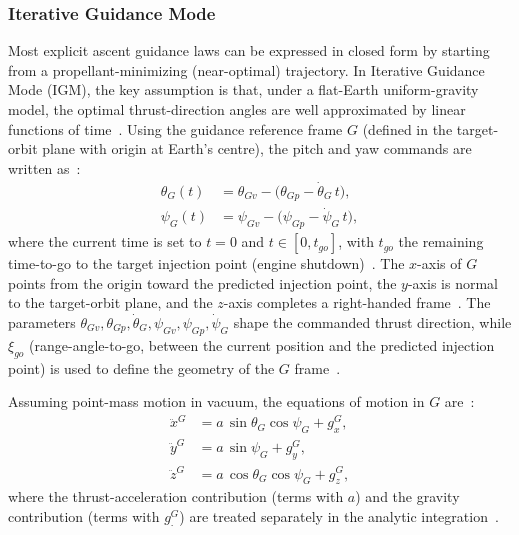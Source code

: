\subsubsection{Iterative Guidance Mode}

Most explicit ascent guidance laws can be expressed in closed form by starting from a propellant-minimizing (near-optimal) trajectory. In Iterative Guidance Mode (IGM), the key assumption is that, under a flat-Earth uniform-gravity model, the optimal thrust-direction angles are well approximated by linear functions of time~\cite{ChandlerSmith1967IterativeGuidanceMode}. Using the guidance reference frame $G$ (defined in the target-orbit plane with origin at Earth’s centre), the pitch and yaw commands are written as~\cite{SONG2015463}:
\begin{align}
\theta_G(t) &= \theta_{Gv} - \bigl(\theta_{Gp} - \dot{\theta}_G\,t\bigr),
\label{eq:igm_theta}\\
\psi_G(t)   &= \psi_{Gv} - \bigl(\psi_{Gp} - \dot{\psi}_G\,t\bigr),
\label{eq:igm_psi}
\end{align}
where the current time is set to $t=0$ and $t\in[0,t_{go}]$, with $t_{go}$ the remaining time-to-go to the target injection point (engine shutdown)~\cite{SONG2015463}.
The $x$-axis of $G$ points from the origin toward the predicted injection point, the $y$-axis is normal to the target-orbit plane, and the $z$-axis completes a right-handed frame~\cite{SONG2015463}. The parameters
$\theta_{Gv},\theta_{Gp},\dot{\theta}_G,\psi_{Gv},\psi_{Gp},\dot{\psi}_G$
shape the commanded thrust direction, while $\xi_{go}$ (range-angle-to-go, between the current position and the predicted injection point) is used to define the geometry of the $G$ frame~\cite{SONG2015463}.

Assuming point-mass motion in vacuum, the equations of motion in $G$ are~\cite{SONG2015463}:
\begin{align}
\ddot{x}^{G} &= a\,\sin\theta_G\cos\psi_G + g_x^{G},
\label{eq:igm_eom_x}\\
\ddot{y}^{G} &= a\,\sin\psi_G            + g_y^{G},
\label{eq:igm_eom_y}\\
\ddot{z}^{G} &= a\,\cos\theta_G\cos\psi_G + g_z^{G},
\label{eq:igm_eom_z}
\end{align}
where the thrust-acceleration contribution (terms with $a$) and the gravity contribution (terms with $g^G_\cdot$) are treated separately in the analytic integration~\cite{SONG2015463}.

